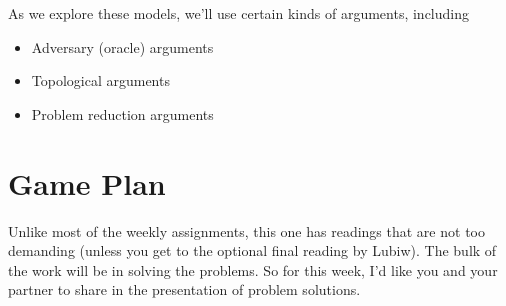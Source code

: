 \documentclass[11pt]{article}
\begin{document}
As we explore these models, we'll use certain kinds of arguments, including
\begin{itemize}
\item Adversary (oracle) arguments
\item Topological arguments
\item Problem reduction arguments
\end{itemize}

\section{Game Plan}
Unlike most of the weekly assignments, this one has readings that are not too demanding (unless you get to the optional
final reading by Lubiw). The bulk of the work will be in solving the problems.  So for this week, I'd like you and your partner
to share in the presentation of problem solutions.
\end{document}
